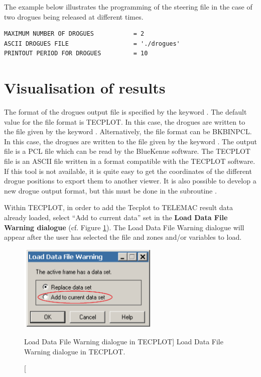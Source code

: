 The example below illustrates the programming of the steering file in the case
of two drogues being released at different times.

\begin{lstlisting}[language=TelemacCas]
MAXIMUM NUMBER OF DROGUES           = 2
ASCII DROGUES FILE                  = './drogues'
PRINTOUT PERIOD FOR DROGUES         = 10
\end{lstlisting}

\section{Visualisation of results}
\label{sec:droguesfile}
The format of the drogues output file is specified by the keyword
.
The default value for the file format is TECPLOT.
In this case, the drogues are written to the file given by the keyword
.
Alternatively, the file format can be BKBINPCL.
In this case, the drogues are written to the file given by the keyword
.
The output file is a PCL file which can be read by the BlueKenue software.
The TECPLOT file is an ASCII file written in a format compatible with the
TECPLOT software.
If this tool is not available, it is quite easy to get the coordinates of the
different drogue positions to export them to another viewer.
It is also possible to develop a new drogue output format, but this must be done
in the subroutine .

Within TECPLOT, in order to add the Tecplot  to TELEMAC
result data already loaded, select ``Add to current data'' set in the
\textbf{Load Data File Warning dialogue} (cf. Figure \ref{fig:load_data}). The
Load Data File Warning dialogue will appear after the user has selected the
file and zones and/or variables to load.

\begin{figure}[H]%
\begin{center}
%
  \includegraphics[width=0.6\textwidth]{./graphics/load_data}
%
\end{center}
\caption
[Load Data File Warning dialogue in TECPLOT]
{Load Data File Warning dialogue in TECPLOT.}
\label{fig:load_data}
\end{figure}


